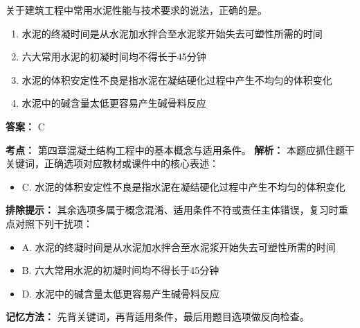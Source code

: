 \documentclass[UTF8,fontset=fandol,11pt]{ctexart}
\begin{document}
\begin{quizbox}[title={第 43 题}]
关于建筑工程中常用水泥性能与技术要求的说法，正确的是。\\
\begin{enumerate}[label=\Alph*.]
\item 水泥的终凝时间是从水泥加水拌合至水泥浆开始失去可塑性所需的时间
\item 六大常用水泥的初凝时间均不得长于45分钟
\item 水泥的体积安定性不良是指水泥在凝结硬化过程中产生不均匀的体积变化
\item 水泥中的碱含量太低更容易产生碱骨料反应
\end{enumerate}
\textbf{答案：} C
\vspace{0.25em}
\begin{answerbox}[title={考点解析}]
\textbf{考点：} 第四章混凝土结构工程中的基本概念与适用条件。
\textbf{解析：} 本题应抓住题干关键词，正确选项对应教材或课件中的核心表述：
\begin{itemize}
\item C. 水泥的体积安定性不良是指水泥在凝结硬化过程中产生不均匀的体积变化
\end{itemize}
\textbf{排除提示：} 其余选项多属于概念混淆、适用条件不符或责任主体错误，复习时重点对照下列干扰项：
\begin{itemize}
\item A. 水泥的终凝时间是从水泥加水拌合至水泥浆开始失去可塑性所需的时间
\item B. 六大常用水泥的初凝时间均不得长于45分钟
\item D. 水泥中的碱含量太低更容易产生碱骨料反应
\end{itemize}
\textbf{记忆方法：} 先背关键词，再背适用条件，最后用题目选项做反向检查。
\end{answerbox}
\end{quizbox}

\vspace{0.2em}
\end{document}
